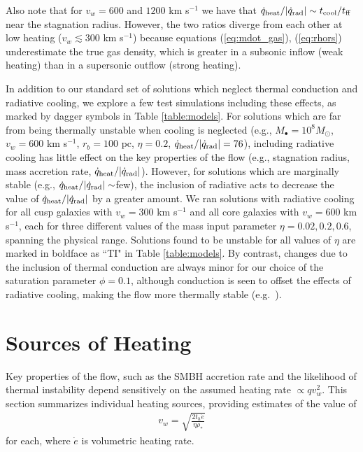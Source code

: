 \documentclass[usenatbib,fleqn]{mn2e}
\newcommand{\rhostar}{\rho_*}
\begin{document}
Also note that for $v_{w}=600$ and $1200$ km s$^{-1}$ we have that
$\dot{q}_{\rm heat}/|\dot{q}_{\rm rad}| \sim t_{\rm cool}/t_{\rm ff}$
near the stagnation radius.  However, the two ratios diverge from each
other at low heating ($v_{w} \lesssim 300$ km s$^{-1}$) because
equations (\ref{eq:mdot_gas}), (\ref{eq:rhors}) underestimate the true
gas density, which is greater in a subsonic inflow (weak heating) than
in a supersonic outflow (strong heating).

In addition to our standard set of solutions which neglect thermal conduction and radiative cooling, we explore a few test simulations including these effects, as marked by dagger symbols in Table \ref{table:models}.  For solutions which are far from being thermally unstable when cooling is neglected (e.g., $M_{\bullet} = 10^{8}M_{\odot}$, $v_{w} = 600$ km s$^{-1}$, $r_{b} = 100$ pc, $\eta = 0.2$, $\dot{q}_{\rm heat}/|\dot{q}_{\rm rad}| = 76$), including radiative cooling has little effect on the key properties of the flow (e.g., stagnation radius, mass accretion rate, $\dot{q}_{\rm heat}/|\dot{q}_{\rm rad}|$).  However, for solutions which are marginally stable (e.g., $\dot{q}_{\rm heat}/|\dot{q}_{\rm rad}| \sim $few), the inclusion of radiative acts to decrease the value of $\dot{q}_{\rm heat}/|\dot{q}_{\rm rad}|$ by a greater amount.  We ran solutions with radiative cooling for all cusp galaxies with $v_w=300$ km s$^{-1}$ and all core galaxies with $v_w=600 $ km s$^{-1}$, each for three different values of the mass input parameter $\eta = 0.02, 0.2, 0.6$, spanning the physical range.  Solutions found to be unstable for all values of $\eta$ are marked in boldface as ``TI" in Table \ref{table:models}.
By contrast, changes due to the inclusion of thermal conduction are always minor for our choice of the saturation parameter $\phi = 0.1$, although conduction is seen to offset the effects of radiative cooling, making the flow more thermally stable (e.g.~\citealt{Zakamska&Narayan03}).  

\section{Sources of Heating}
\label{sec:heating}

Key properties of the flow, such as the SMBH accretion rate and the likelihood of thermal instability depend sensitively on the assumed heating rate $\propto qv_{w}^{2}$.  This section summarizes individual heating sources, providing estimates of the value of
\begin{align}
  v_{w} = \sqrt{\frac{2 t_h \dot{e}}{\eta \rhostar}}
  \label{eq:vw_eff}
\end{align}
for each, where $\dot{e}$ is volumetric heating rate.  
\end{document}
